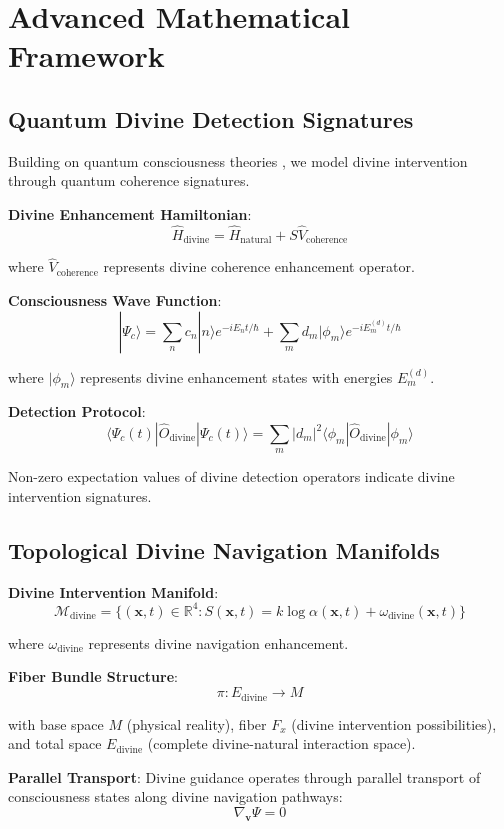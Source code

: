 \documentclass[12pt,a4paper]{article}
\begin{document}
\section{Advanced Mathematical Framework}

\subsection{Quantum Divine Detection Signatures}

Building on quantum consciousness theories \citep{penrose1994shadows, hameroff2014consciousness}, we model divine intervention through quantum coherence signatures.

\textbf{Divine Enhancement Hamiltonian}:
$$\hat{H}_{\text{divine}} = \hat{H}_{\text{natural}} + S \hat{V}_{\text{coherence}}$$

where $\hat{V}_{\text{coherence}}$ represents divine coherence enhancement operator.

\textbf{Consciousness Wave Function}:
$$|\Psi_c\rangle = \sum_n c_n |n\rangle e^{-iE_n t/\hbar} + \sum_m d_m |\phi_m\rangle e^{-iE_m^{(d)} t/\hbar}$$

where $|\phi_m\rangle$ represents divine enhancement states with energies $E_m^{(d)}$.

\textbf{Detection Protocol}:
$$\langle \Psi_c(t)|\hat{O}_{\text{divine}}|\Psi_c(t)\rangle = \sum_m |d_m|^2 \langle \phi_m|\hat{O}_{\text{divine}}|\phi_m\rangle$$

Non-zero expectation values of divine detection operators indicate divine intervention signatures.

\subsection{Topological Divine Navigation Manifolds}

\textbf{Divine Intervention Manifold}:
$$\mathcal{M}_{\text{divine}} = \{(\mathbf{x}, t) \in \mathbb{R}^4 : S(\mathbf{x}, t) = k \log \alpha(\mathbf{x}, t) + \omega_{\text{divine}}(\mathbf{x}, t)\}$$

where $\omega_{\text{divine}}$ represents divine navigation enhancement.

\textbf{Fiber Bundle Structure}:
$$\pi: E_{\text{divine}} \to M$$

with base space $M$ (physical reality), fiber $F_x$ (divine intervention possibilities), and total space $E_{\text{divine}}$ (complete divine-natural interaction space).

\textbf{Parallel Transport}: Divine guidance operates through parallel transport of consciousness states along divine navigation pathways:
$$\nabla_{\mathbf{v}} \Psi = 0$$
\end{document}
